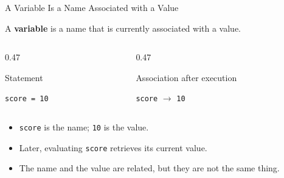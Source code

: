 \documentclass[aspectratio=169,10pt]{beamer}
\begin{document}
\begin{frame}{A Variable Is a Name Associated with a Value}

  \begin{cpdefinition}

    A \textbf{variable} is a name that is currently associated with a value.

  \end{cpdefinition}

  \begin{columns}[T,onlytextwidth]

    \begin{column}{0.47\textwidth}

      \begin{block}{Statement}

        \centering
        \Large\texttt{score = 10}

      \end{block}

    \end{column}

    \begin{column}{0.47\textwidth}

      \begin{block}{Association after execution}

        \centering
        \Large\texttt{score} $\longrightarrow$ \texttt{10}

      \end{block}

    \end{column}

  \end{columns}

  \vspace{0.10in}

  \begin{itemize}

    \item \texttt{score} is the name; \texttt{10} is the value.

    \item Later, evaluating \texttt{score} retrieves its current value.

    \item The name and the value are related, but they are not the same thing.

  \end{itemize}

\end{frame}
\end{document}
